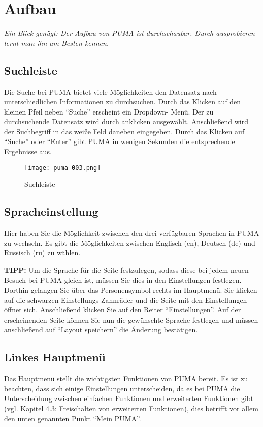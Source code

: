 \section{Aufbau}
\textit{Ein Blick genügt: Der Aufbau von PUMA ist durchschaubar. Durch ausprobieren lernt man ihn am Besten kennen.}
\subsection{Suchleiste}
Die Suche bei PUMA bietet viele Möglichkeiten den Datensatz nach unterschiedlichen Informationen zu durchsuchen. Durch das Klicken auf den kleinen Pfeil neben \enquote{Suche} erscheint ein Dropdown- Menü.  Der zu durchsuchende Datensatz wird durch anklicken ausgewählt. Anschließend wird der Suchbegriff in das weiße Feld daneben eingegeben. Durch das Klicken auf \enquote{Suche} oder \enquote{Enter} gibt PUMA in wenigen Sekunden die entsprechende Ergebnisse aus.

\begin{figure}[ht]
 \centering
 \texttt{[image: puma-003.png]}
 \caption{Suchleiste}
 \label{figure3}
\end{figure}  

\subsection{Spracheinstellung}
Hier haben Sie die Möglichkeit zwischen den drei verfügbaren Sprachen in PUMA zu wechseln. Es gibt die Möglichkeiten zwischen Englisch (en), Deutsch (de) und Russisch (ru) zu wählen.
\newline
\begin{shaded}
\centering
\textbf{TIPP:} Um die Sprache für die Seite festzulegen, sodass diese bei jedem neuen Besuch bei PUMA gleich ist, müssen Sie dies in den Einstellungen festlegen. Dorthin gelangen Sie über das Personensymbol rechts im Hauptmenü. Sie klicken auf die schwarzen Einstellungs-Zahnräder und die Seite mit den Einstellungen öffnet sich. Anschließend klicken Sie auf den Reiter \enquote{Einstellungen}. Auf der erscheinenden Seite können Sie nun die gewünschte Sprache festlegen und müssen anschließend auf \enquote{Layout speichern} die Änderung bestätigen.
\end{shaded}
\subsection{Linkes Hauptmenü}
Das Hauptmenü stellt die wichtigsten Funktionen von PUMA bereit. Es ist zu beachten, dass sich einige Einstellungen unterscheiden, da es bei PUMA die Unterscheidung zwischen einfachen Funktionen und erweiterten Funktionen gibt (vgl. Kapitel 4.3: Freischalten von erweiterten Funktionen), dies betrifft vor allem den unten genannten Punkt \enquote{Mein PUMA}. 
